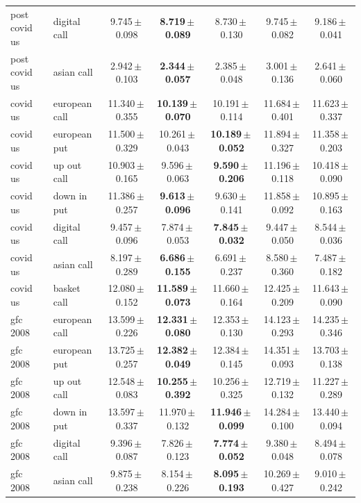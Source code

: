 \documentclass[11pt,oneside]{report}
\begin{document}
\begin{table}[H]
\begin{tabular}{llccccc}
post covid us & digital call & 9.745\,$\pm$\,0.098 & \textbf{8.719\,$\pm$\,0.089} & 8.730\,$\pm$\,0.130 & 9.745\,$\pm$\,0.082 & 9.186\,$\pm$\,0.041 \\
post covid us & asian call & 2.942\,$\pm$\,0.103 & \textbf{2.344\,$\pm$\,0.057} & 2.385\,$\pm$\,0.048 & 3.001\,$\pm$\,0.136 & 2.641\,$\pm$\,0.060 \\
\midrule
covid us & european call & 11.340\,$\pm$\,0.355 & \textbf{10.139\,$\pm$\,0.070} & 10.191\,$\pm$\,0.114 & 11.684\,$\pm$\,0.401 & 11.623\,$\pm$\,0.337 \\
covid us & european put & 11.500\,$\pm$\,0.329 & 10.261\,$\pm$\,0.043 & \textbf{10.189\,$\pm$\,0.052} & 11.894\,$\pm$\,0.327 & 11.358\,$\pm$\,0.203 \\
covid us & up out call & 10.903\,$\pm$\,0.165 & 9.596\,$\pm$\,0.063 & \textbf{9.590\,$\pm$\,0.206} & 11.196\,$\pm$\,0.118 & 10.418\,$\pm$\,0.090 \\
covid us & down in put & 11.386\,$\pm$\,0.257 & \textbf{9.613\,$\pm$\,0.096} & 9.630\,$\pm$\,0.141 & 11.858\,$\pm$\,0.092 & 10.895\,$\pm$\,0.163 \\
covid us & digital call & 9.457\,$\pm$\,0.096 & 7.874\,$\pm$\,0.053 & \textbf{7.845\,$\pm$\,0.032} & 9.447\,$\pm$\,0.050 & 8.544\,$\pm$\,0.036 \\
covid us & asian call & 8.197\,$\pm$\,0.289 & \textbf{6.686\,$\pm$\,0.155} & 6.691\,$\pm$\,0.237 & 8.580\,$\pm$\,0.360 & 7.487\,$\pm$\,0.182 \\
covid us & basket call & 12.080\,$\pm$\,0.152 & \textbf{11.589\,$\pm$\,0.073} & 11.660\,$\pm$\,0.164 & 12.425\,$\pm$\,0.209 & 11.643\,$\pm$\,0.090 \\
\midrule
gfc 2008 & european call & 13.599\,$\pm$\,0.226 & \textbf{12.331\,$\pm$\,0.080} & 12.353\,$\pm$\,0.130 & 14.123\,$\pm$\,0.293 & 14.235\,$\pm$\,0.346 \\
gfc 2008 & european put & 13.725\,$\pm$\,0.257 & \textbf{12.382\,$\pm$\,0.049} & 12.384\,$\pm$\,0.145 & 14.351\,$\pm$\,0.093 & 13.703\,$\pm$\,0.138 \\
gfc 2008 & up out call & 12.548\,$\pm$\,0.083 & \textbf{10.255\,$\pm$\,0.392} & 10.256\,$\pm$\,0.325 & 12.719\,$\pm$\,0.132 & 11.227\,$\pm$\,0.289 \\
gfc 2008 & down in put & 13.597\,$\pm$\,0.337 & 11.970\,$\pm$\,0.132 & \textbf{11.946\,$\pm$\,0.099} & 14.284\,$\pm$\,0.100 & 13.440\,$\pm$\,0.094 \\
gfc 2008 & digital call & 9.396\,$\pm$\,0.087 & 7.826\,$\pm$\,0.123 & \textbf{7.774\,$\pm$\,0.052} & 9.380\,$\pm$\,0.048 & 8.494\,$\pm$\,0.078 \\
gfc 2008 & asian call & 9.875\,$\pm$\,0.238 & 8.154\,$\pm$\,0.226 & \textbf{8.095\,$\pm$\,0.193} & 10.269\,$\pm$\,0.427 & 9.010\,$\pm$\,0.242 \\
\bottomrule
\end{tabular}
\end{table}
\end{document}
